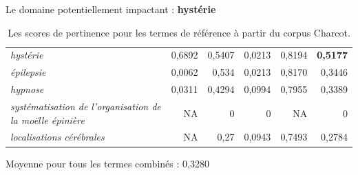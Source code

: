 \documentclass[xcolor={table,usenames,dvipsnames}]{beamer}
\newcommand{\bolder}[1]{{\color{purple}\bfseries#1}}
\begin{document}
\begin{frame}{Le domaine potentiellement impactant : \textbf{hystérie}}
\begin{table}[h]
{\begin{tabular}{|l|r|r|r|r|r|}
					\rowcolor{yellow!30}\textit{hystérie} & 0,6892 & 0,5407 & 0,0213 & 0,8194 & \bolder{0,5177} \\
					\textit{épilepsie} & 0,0062 & 0,534 & 0,0213 & 0,8170 & 0,3446 \\
					\textit{hypnose} & 0,0311 & 0,4294 & 0,0994 & 0,7955 & 0,3389\\
					\textit{systématisation de l'organisation de la moëlle épinière} & NA & 0 & 0 & NA & 0 \\
					\textit{localisations cérébrales} & NA & 0,27 & 0,0943 & 0,7493 & 0,2784 \\
					\hline
				\end{tabular}
			}
			\caption{Les scores de pertinence pour les termes de référence à partir du corpus \og{}Charcot\fg{}.}
		\end{table}
		{\small Moyenne pour tous les termes combinés : 0,3280}
	\end{frame}
	
	
	
\end{document}
